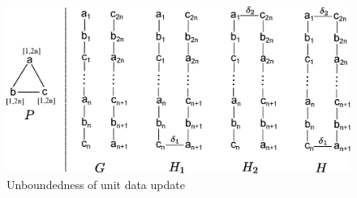 \vspace{-1.5ex}
\begin{figure}[h!]
\label{fig-inc-complexity-data}
\begin{center}
\includegraphics[scale=0.31]{./fig/inc-complexity-proof-data.eps}
\end{center}
\vspace{-3ex}
\caption{Unboundedness of unit data update}
\vspace{-2ex}
\end{figure}


